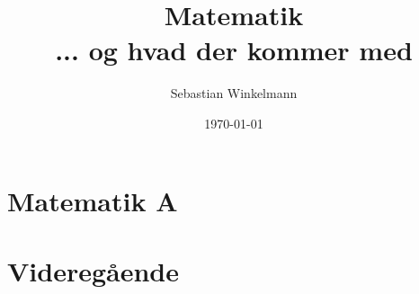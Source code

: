 \documentclass[oneside,11pt, a4paper, footinclude=true, headinclude=true, cleardoublepage=empty]{scrbook}
\title{
  \Huge{Matematik}\\
  \Large{... og hvad der kommer med}
}
\author{
  \Large{Sebastian Winkelmann}
}
\date{\today}
\theoremstyle{definition}
\theoremstyle{plain}
\theoremstyle{lemma}
\begin{document}
\clearpage\maketitle
\thispagestyle{empty}
\tableofcontents
{}\part{Matematik A}
\part{Videregående}
%



\newpage
\end{document}
